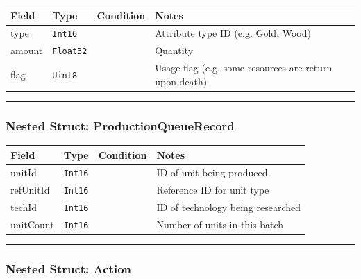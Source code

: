 \begin{longtable}{@{}p{}p{}p{}p{}@{}}
  \toprule
  Field & Type & Condition & Notes \\
  \midrule
  \endhead
  type & \texttt{Int16} & & Attribute type ID (e.g. Gold, Wood) \\
  amount & \texttt{Float32} & & Quantity \\
  flag & \texttt{Uint8} & & Usage flag (e.g. some resources are return upon death) \\
  \bottomrule
\end{longtable}

\par\noindent\rule{\textwidth}{0.4pt}

\subsubsection*{Nested Struct: ProductionQueueRecord}

\begin{longtable}{@{}p{}p{}p{}p{}@{}}
  \toprule
  Field & Type & Condition & Notes \\
  \midrule
  \endhead
  unitId & \texttt{Int16} & & ID of unit being produced \\
  refUnitId & \texttt{Int16} & & Reference ID for unit type \\
  techId & \texttt{Int16} & & ID of technology being researched \\
  unitCount & \texttt{Int16} & & Number of units in this batch \\
  \bottomrule
\end{longtable}

\par\noindent\rule{\textwidth}{0.4pt}

\subsubsection*{Nested Struct: Action}

